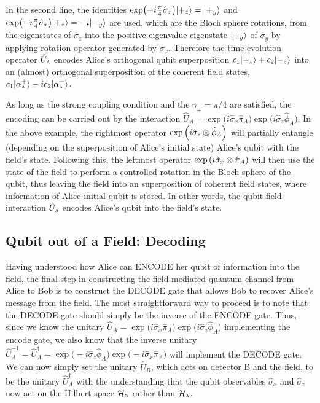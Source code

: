 \documentclass[a4paper,12pt]{article}
\begin{document}
In the second line, the identities $\exp(+ i \frac{\pi}{4}\hat\sigma_x) | +_z \rangle = | +_y \rangle $ and $\exp(- i \frac{\pi}{4}\hat\sigma_x) | +_z \rangle =-i | -_y \rangle $ are used, which are the Bloch sphere rotations, from the eigenstates of $\hat\sigma_z$ into the positive eigenvalue eigenstate $ | +_y \rangle $ of $\hat\sigma_y$ by applying rotation operator generated by $\hat\sigma_x$. 
Therefore the time evolution operator $\hat U_\textsc{a}$ encodes Alice's orthogonal qubit superposition $c_1| +_z \rangle +c_2 | -_z \rangle $ into an (almost) orthogonal superposition of the coherent field states, $c_1| \alpha_\textsc{a}^+ \rangle- i c_2 | \alpha_\textsc{a}^{-} \rangle $.

As long as the strong coupling condition and the $\gamma_{ \pm } = \pi / 4$ are satisfied, the encoding can be carried out by the interaction $\hat U_A = \exp\big(i\hat\sigma_x\hat \pi_A\big)\exp\big(i\hat\sigma_z\hat \phi_A \big)$. 
In the above example, the rightmost operator $\exp\left( i\hat\sigma_z \otimes \hat \phi_A \right)$ will partially entangle (depending on the superposition of Alice's initial state) Alice's qubit with the field's state. 
Following this, the leftmost operator $\exp\left( i \hat \sigma_x \otimes \hat\pi_A \right)$ will then use the state of the field to perform a controlled rotation in the Bloch sphere of the qubit, thus leaving the field into an superposition of coherent field states, where information of Alice initial qubit is stored. 
In other words, the qubit-field interaction $\hat U_\textsc{a}$ encodes Alice's qubit into the field's state.

\subsection*{Qubit out of a Field: Decoding}

Having understood how Alice can ENCODE her qubit of information into the field, the final step in constructing the field-mediated quantum channel from Alice to Bob is to construct the DECODE gate that allows Bob to recover Alice's message from the field. 
The most straightforward way to proceed is to note that the DECODE gate should simply be the inverse of the ENCODE gate. 
Thus, since we know the unitary $\hat U_A=\exp\big(i\hat\sigma_x\hat \pi_A\big)\exp\big(i\hat\sigma_z \hat \phi_A\big)$ implementing the encode gate, we also know that the inverse unitary $\hat U_A^{-1}=\hat U_A^\dagger=\exp\big(-i\hat\sigma_z \hat \phi_A\big)\exp\big(-i\hat\sigma_x \hat\pi_A\big)$ will implement the DECODE gate. We can now simply set the unitary $\hat U_B$, which acts on detector B and the field, to be the unitary $\hat U_A^\dagger$ with the understanding that the qubit observables $\hat\sigma_x$ and $\hat\sigma_z$ now act on the Hilbert space $\mathcal H_\textsc{b}$ rather than $\mathcal H_\textsc{a}$.
\end{document}
